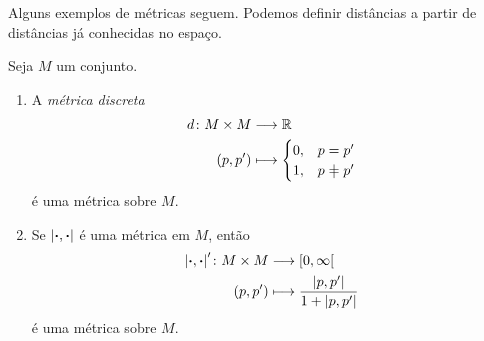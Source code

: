 Alguns exemplos de métricas seguem. Podemos definir distâncias a partir de distâncias já conhecidas no espaço.

\begin{proposition}
Seja $M$ um conjunto.
	\begin{enumerate}
	\item A \emph{métrica discreta}
		\begin{align*}
		\func{d}{M \times M}{\R}{(p,p')}{
			\begin{cases}
				0,& p = p' \\
				1,& p \neq p'
			\end{cases}
		}
		\end{align*}
é uma métrica sobre $M$.

	\item Se $\left\vert{\bm{\cdot}},{\bm{\cdot}}\right\vert$ é uma métrica em $M$, então
		\begin{align*}
		{\left\vert{\bm{\cdot}},{\bm{\cdot}}\right\vert'}\colon {M \times M} &\longrightarrow {\left[{0},{\infty}\right[} \\{(p,p')} &\longmapsto \frac{\left\vert{p},{p'}\right\vert}{1+\left\vert{p},{p'}\right\vert}
		\end{align*}
	é uma métrica sobre $M$.
	\end{enumerate}
\end{proposition}


